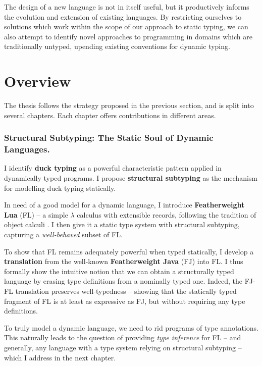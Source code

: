 The design of a new language is not in itself useful, but it productively informs the evolution and extension of existing languages.
By restricting ourselves to solutions which work within the scope of our approach to static typing, we can also attempt to identify novel approaches to programming in domains which are traditionally untyped, upending existing conventions for dynamic typing. 

\section{Overview}

The thesis follows the strategy proposed in the previous section, and is split into several chapters. Each chapter offers contributions in different areas.

\subsubsection{Structural Subtyping: The Static Soul of Dynamic Languages.} 

I identify \textbf{duck typing} as a powerful characteristic pattern applied in dynamically typed programs. I propose \textbf{structural subtyping} as the mechanism for modelling duck typing statically. 

In need of a good model for a dynamic language, I introduce \textbf{Featherweight Lua} (FL) -- a simple $\lambda$ calculus with extensible records, following the tradition of object calculi \cite{abadi-cardelli-object-calculus}. I then give it a static type system with structural subtyping, capturing a \emph{well-behaved} subset of FL.

To show that FL remains adequately powerful when typed statically, I develop a \textbf{translation} from the well-known \textbf{Featherweight Java} (FJ) into FL. 
I thus formally show the intuitive notion that we can obtain a structurally typed language by erasing type definitions from a nominally typed one.
Indeed, the FJ-FL translation preserves well-typedness -- showing that the statically typed fragment of FL is at least as expressive as FJ, but without requiring any type definitions. 

To truly model a dynamic language, we need to rid programs of type annotations. This naturally leads to the question of providing \emph{type inference} for FL -- and generally, any language with a type system relying on structural subtyping -- which I address in the next chapter.

